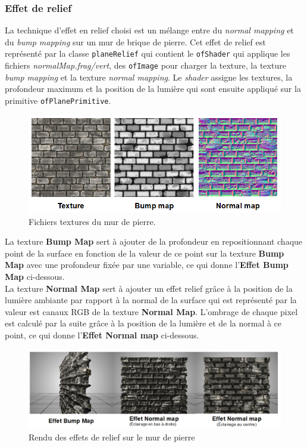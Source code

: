 \subsubsection{Effet de relief}
\label{s:relief}
La technique d'effet en relief choisi est un mélange entre du \textit{normal mapping} et du \textit{bump mapping} sur un mur de brique de pierre. Cet effet de relief est représenté par la classe \texttt{planeRelief} qui contient le \texttt{ofShader} qui applique les fichiers \textit{normalMap.frag/vert}, des \texttt{ofImage} pour charger la texture, la texture \textit{bump mapping} et la texture \textit{normal mapping}. Le \textit{shader} assigne les textures, la profondeur maximum et la position de la lumière qui sont ensuite appliqué sur la primitive \texttt{ofPlanePrimitive}.

\begin{figure}[H]
    \centering
	\includegraphics[scale=0.8]{img/infog-image-mur-pierre.png}
	\caption{Fichiers textures du mur de pierre.}
	\label{fig:wallfiles}
\end{figure}

La texture \textbf{Bump Map} sert à ajouter de la profondeur en repositionnant chaque point de la surface en fonction de la valeur de ce point sur la texture \textbf{Bump Map} avec une profondeur fixée par une variable, ce qui donne l'\textbf{Effet Bump Map} ci-dessous. \\

La texture \textbf{Normal Map} sert à ajouter un effet relief grâce à la position de la lumière ambiante par rapport à la normal de la surface qui est représenté par la valeur est canaux RGB de la texture \textbf{Normal Map}. L'ombrage de chaque pixel est calculé par la suite grâce à la position de la lumière et de la normal à ce point, ce qui donne l'\textbf{Effet Normal map} ci-dessous.

\begin{figure}[H]
    \centering
	\includegraphics[scale=0.62]{img/infog-image-rendu-mur-pierre.png}
	\caption{Rendu des effets de relief sur le mur de pierre}
	\label{fig:wallnormalbumprender}
\end{figure}

